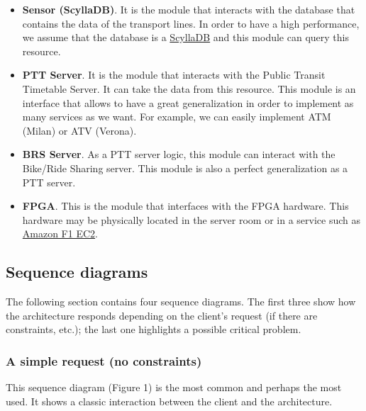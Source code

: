 \documentclass[a4paper]{article}
\begin{document}
\begin{itemize}
        \item \textbf{Sensor (ScyllaDB)}. It is the module that interacts with the database that contains the data of the transport lines. In order to have a high performance, we assume that the database is a \href{https://www.scylladb.com/product/technology/}{ScyllaDB} and this module can query this resource.

        \item \textbf{PTT Server}. It is the module that interacts with the Public Transit Timetable Server. It can take the data from this resource. This module is an interface that allows to have a great generalization in order to implement as many services as we want. For example, we can easily implement ATM (Milan) or ATV (Verona).
        
        \item \textbf{BRS Server}. As a PTT server logic, this module can interact with the Bike/Ride Sharing server. This module is also a perfect generalization as a PTT server.

        \item \textbf{FPGA}. This is the module that interfaces with the FPGA hardware. This hardware may be physically located in the server room or in a service such as \href{https://aws.amazon.com/ec2/instance-types/f1/}{Amazon F1 EC2}.
    \end{itemize}    

    \newpage

    \subsection{Sequence diagrams}

    The following section contains four sequence diagrams. The first three show how the architecture responds depending on the client's request (if there are constraints, etc.); the last one highlights a possible critical problem.

    \subsubsection*{A simple request (no constraints)}

    This sequence diagram (Figure 1) is the most common and perhaps the most used. It shows a classic interaction between the client and the architecture.
\end{document}

